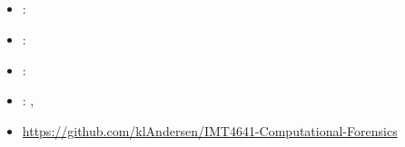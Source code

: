 \subsection[Computational Forensics]{}
\label{sec:comp_forensics}
\begin{itemize} 
	\item {}: 
	\item {}: 
	\item {}: 
	\item {}: , 
	\item {} \url{https://github.com/klAndersen/IMT4641-Computational-Forensics}
\end{itemize} 

